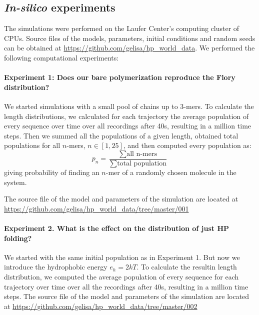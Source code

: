 \documentclass[5p,times]{elsarticle}
\begin{document}
\subsection{\textit{In-silico} experiments}\label{sec:experiments}
The simulations were performed on the Laufer Center's computing cluster of CPUs. 
Source files of the models, parameters, initial conditions and random seeds can be obtained at 
\url{https://github.com/gelisa/hp_world_data}.  We performed the following computational 
experiments:


\paragraph{Experiment 1: Does our bare polymerization reproduce the Flory 
distribution?}\label{sec:expt1}
We started simulations with a small pool of chains up to 3-mers. To calculate the length 
distributions, 
we calculated for each trajectory the average population of every sequence over time over all 
recordings after 40s, resulting in a million time steps.  Then we summed all the populations of a 
given 
length, obtained total populations for all $n$-mers, $n\in[1,25]$, and then computed every 
population as:
\begin{equation}
 p_n = \frac{\sum\mbox{all n-mers}}{\sum\mbox{total population}}
\end{equation}
giving probability of finding an $n$-mer of a randomly chosen molecule in the system.

The source file of the model and parameters of the simulation are located at 
\url{https://github.com/gelisa/hp_world_data/tree/master/001}

\paragraph{Experiment 2. What is the effect on the distribution of just HP folding?}
We started with the same initial population as in Experiment 1. But now we introduce the hydrophobic 
energy $e_h= 2kT$. To calculate the resultin length distribution, we computed the average population 
of every sequence for each trajectory over time over all the recordings after 40s, resulting in a 
million time steps. The source file of the model and parameters of the 
simulation are located at \url{https://github.com/gelisa/hp_world_data/tree/master/002}
\end{document}
